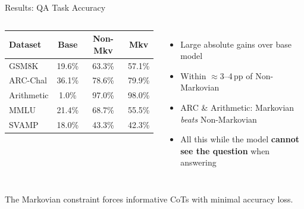 \documentclass[aspectratio=169]{beamer}
\begin{document}
\begin{frame}{Results: QA Task Accuracy}

\begin{columns}[T]
\begin{table}
\centering
\small
\begin{tabular}{lccc}
\toprule
Dataset & Base & Non-Mkv & Mkv \\
\midrule
GSM8K & 19.6\% & 63.3\% & 57.1\% \\
ARC-Chal & 36.1\% & 78.6\% & 79.9\% \\
Arithmetic & 1.0\% & 97.0\% & 98.0\% \\
MMLU & 21.4\% & 68.7\% & 55.5\% \\
SVAMP & 18.0\% & 43.3\% & 42.3\% \\
\bottomrule
\end{tabular}
\end{table}

\vspace{0.3cm}
\begin{itemize}
    \item Large absolute gains over base model
    \item Within $\approx$3--4\,pp of Non-Markovian
    \item ARC \& Arithmetic: Markovian \emph{beats} Non-Markovian
    \item All this while the model \textbf{cannot see the question} when answering
\end{itemize}
\end{columns}

\vspace{0.5cm}
\begin{center}
\colorbox{mkgreen!10}{\parbox{0.85\textwidth}{\centering
The Markovian constraint forces informative CoTs with minimal accuracy loss.
}}
\end{center}
\end{frame}

%
\end{document}
